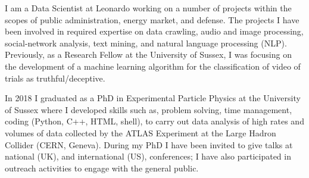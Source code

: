 
I am a Data Scientist at Leonardo working on a number of projects within the scopes of public administration, energy market, and defense. The projects I have been involved in required expertise on data crawling, audio and image processing, social-network analysis, text mining, and natural language processing (NLP). Previously, as a Research Fellow at the University of Sussex, I was focusing on the development of a machine learning algorithm for the classification of video of trials as truthful/deceptive. 

In 2018 I graduated as a PhD in Experimental Particle Physics at the University of Sussex where I developed skills such as, problem solving, time management, coding (Python, C++, HTML, shell), to carry out data analysis of high rates and volumes of data collected by the ATLAS Experiment at the Large Hadron Collider (CERN, Geneva). During my PhD I have been invited to give talks at national (UK), and international (US), conferences; I have also participated in outreach activities to engage with the general public.